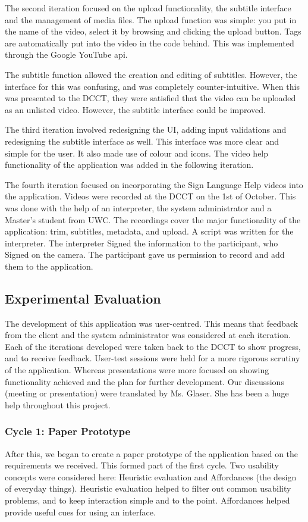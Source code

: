 \documentclass{sig-alternate-05-2015}
\begin{document}
The second iteration focused on the upload functionality, the subtitle interface and the management of media files. The upload function was simple: you put in the name of the video, select it by browsing and clicking the upload button. Tags are automatically put into the video in the code behind. This was implemented through the Google YouTube api.

The subtitle function allowed the creation and editing of subtitles. However, the interface for this was confusing, and was completely counter-intuitive. When this was presented to the DCCT, they were satisfied that the video can be uploaded as an unlisted video. However, the subtitle interface could be improved.

The third iteration involved redesigning the UI, adding input validations and redesigning the subtitle interface as well. This interface was more clear and simple for the user. It also made use of colour and icons. The video help functionality of the application was added in the following iteration.

The fourth iteration focused on incorporating the Sign Language Help videos into the application. Videos were recorded at the DCCT on the 1st of October. This was done with the help of an interpreter, the system administrator and a Master's student from UWC. The recordings cover the major functionality of the application: trim, subtitles, metadata, and upload. A script was written for the interpreter. The interpreter Signed the information to the participant, who Signed on the camera. The participant gave us permission to record and add them to the application.

\subsection{Experimental Evaluation}\label{Experiment Eval}
The development of this application was user-centred. This means that feedback from the client and the system administrator was considered at each iteration. Each of the iterations developed were taken back to the DCCT to show progress, and to receive feedback. User-test sessions were held for a more rigorous scrutiny of the application. Whereas presentations were more focused on showing functionality achieved and the plan for further development. Our discussions (meeting or presentation) were translated by Ms. Glaser. She has been a huge help throughout this project.

\subsubsection{Cycle 1: Paper Prototype}
After this, we began to create a paper prototype of the application based on the requirements we received. This formed part of the first cycle. Two usability concepts were considered here: Heuristic evaluation \cite{lewis1993task} and Affordances (the design of everyday things). Heuristic evaluation helped to filter out common usability problems, and to keep interaction simple and to the point. Affordances helped provide useful cues for using an interface.
\end{document}
